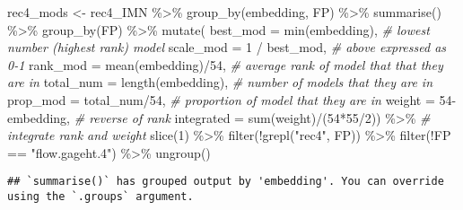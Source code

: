 \documentclass[
]{article}
\newenvironment{Shaded}{\begin{snugshade}}{\end{snugshade}}
\newcommand{\AttributeTok}[1]{\textcolor[rgb]{0.77,0.63,0.00}{#1}}
\newcommand{\CommentTok}[1]{\textcolor[rgb]{0.56,0.35,0.01}{\textit{#1}}}
\newcommand{\DecValTok}[1]{\textcolor[rgb]{0.00,0.00,0.81}{#1}}
\newcommand{\FunctionTok}[1]{\textcolor[rgb]{0.00,0.00,0.00}{#1}}
\newcommand{\NormalTok}[1]{#1}
\newcommand{\OtherTok}[1]{\textcolor[rgb]{0.56,0.35,0.01}{#1}}
\newcommand{\SpecialCharTok}[1]{\textcolor[rgb]{0.00,0.00,0.00}{#1}}
\newcommand{\StringTok}[1]{\textcolor[rgb]{0.31,0.60,0.02}{#1}}
\begin{document}
\begin{Shaded}
\begin{Highlighting}[]
\NormalTok{rec4\_mods }\OtherTok{\textless{}{-}}\NormalTok{ rec4\_IMN }\SpecialCharTok{\%\textgreater{}\%}
  \FunctionTok{group\_by}\NormalTok{(embedding, FP) }\SpecialCharTok{\%\textgreater{}\%} 
  \FunctionTok{summarise}\NormalTok{() }\SpecialCharTok{\%\textgreater{}\%} 
  \FunctionTok{group\_by}\NormalTok{(FP) }\SpecialCharTok{\%\textgreater{}\%} 
  \FunctionTok{mutate}\NormalTok{(}
    \AttributeTok{best\_mod =} \FunctionTok{min}\NormalTok{(embedding), }\CommentTok{\# lowest number (highest rank) model}
    \AttributeTok{scale\_mod =} \DecValTok{1} \SpecialCharTok{/}\NormalTok{ best\_mod, }\CommentTok{\# above expressed as 0{-}1}
    \AttributeTok{rank\_mod =} \FunctionTok{mean}\NormalTok{(embedding)}\SpecialCharTok{/}\DecValTok{54}\NormalTok{, }\CommentTok{\# average rank of model that that they are in}
    \AttributeTok{total\_num =} \FunctionTok{length}\NormalTok{(embedding), }\CommentTok{\# number of models that they are in}
    \AttributeTok{prop\_mod =}\NormalTok{ total\_num}\SpecialCharTok{/}\DecValTok{54}\NormalTok{, }\CommentTok{\# proportion of model that they are in }
    \AttributeTok{weight =} \DecValTok{54}\SpecialCharTok{{-}}\NormalTok{embedding, }\CommentTok{\# reverse of rank}
    \AttributeTok{integrated =} \FunctionTok{sum}\NormalTok{(weight)}\SpecialCharTok{/}\NormalTok{(}\DecValTok{54}\SpecialCharTok{*}\DecValTok{55}\SpecialCharTok{/}\DecValTok{2}\NormalTok{)) }\SpecialCharTok{\%\textgreater{}\%} \CommentTok{\# integrate rank and weight }
  \FunctionTok{slice}\NormalTok{(}\DecValTok{1}\NormalTok{) }\SpecialCharTok{\%\textgreater{}\%} 
  \FunctionTok{filter}\NormalTok{(}\SpecialCharTok{!}\FunctionTok{grepl}\NormalTok{(}\StringTok{"rec4"}\NormalTok{, FP)) }\SpecialCharTok{\%\textgreater{}\%} 
  \FunctionTok{filter}\NormalTok{(}\SpecialCharTok{!}\NormalTok{FP }\SpecialCharTok{==} \StringTok{"flow.gageht.4"}\NormalTok{) }\SpecialCharTok{\%\textgreater{}\%}
  \FunctionTok{ungroup}\NormalTok{()}
\end{Highlighting}
\end{Shaded}

\begin{verbatim}
## `summarise()` has grouped output by 'embedding'. You can override using the `.groups` argument.
\end{verbatim}

\begin{Shaded}
\end{Shaded}
\end{document}
